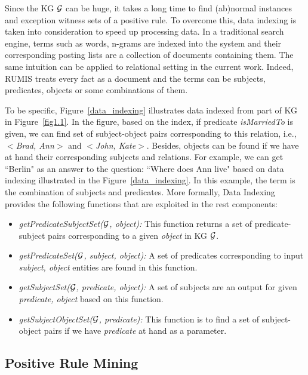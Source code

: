 Since the KG $\mathcal{G}$ can be huge, it takes a long time to find (ab)normal instances and exception witness sets of a positive rule. To overcome this, data indexing is taken into consideration to speed up processing data. In a traditional search engine, terms such as words, n-grams are indexed into the system and their corresponding posting lists are a collection of documents containing them. The same intuition can be applied to relational setting in the current work. Indeed, RUMIS treats every fact as a document and the terms can be subjects, predicates, objects or some combinations of them.

To be specific, Figure~\ref{data_indexing} illustrates data indexed from part of KG in Figure~\ref{fig1.1}. In the figure, based on the index, if predicate \textit{isMarriedTo} is given, we can find set of subject-object pairs corresponding to this relation, i.e., \textit{$<$Brad, Ann$>$} and \textit{$<$John, Kate$>$}. Besides, objects can be found if we have at hand their corresponding subjects and relations. For example, we can get ``Berlin" as an answer to the question: ``Where does Ann live" based on data indexing illustrated in the Figure~\ref{data_indexing}. In this example, the term is the combination of subjects and predicates. More formally, Data Indexing provides the following functions that are exploited in the rest components:

\begin{itemize}
\item \textit{getPredicateSubjectSet($\mathcal{G}$, object):} This function returns a set of predicate-subject pairs corresponding to a given \textit{object} in KG $\mathcal{G}$.
\item \textit{getPredicateSet($\mathcal{G}$, subject, object):} A set of predicates corresponding to input \textit{subject, object} entities are found in this function.
\item \textit{getSubjectSet($\mathcal{G}$, predicate, object):} A set of subjects are an output for given \textit{predicate, object} based on this function.
\item \textit{getSubjectObjectSet($\mathcal{G}$, predicate):} This function is to find a set of subject-object pairs if we have \textit{predicate} at hand as a parameter.
\end{itemize}

\subsection{Positive Rule Mining}

